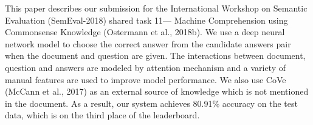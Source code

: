 This paper describes our submission for the International Workshop on Semantic Evaluation (SemEval-2018) shared task 11--- Machine Comprehension using Commonsense Knowledge (Ostermann et al., 2018b). We use a deep neural network model to choose the correct answer from the candidate answers pair when the document and question are given. The interactions between document, question and answers are modeled by attention mechanism and a variety of manual features are used to improve model performance. We also use CoVe (McCann et al., 2017) as an external source of knowledge which is not mentioned in the document. As a result, our system achieves 80.91\% accuracy on the test data, which is on the third place of the leaderboard.
